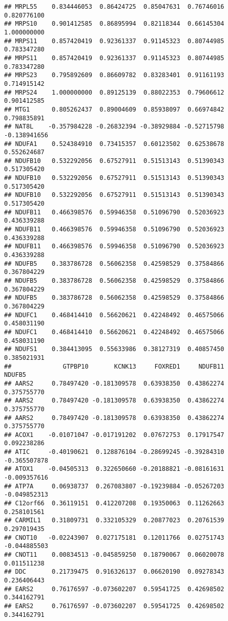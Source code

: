 \documentclass[
]{article}
\begin{document}
\begin{verbatim}
## MRPL55    0.834446053  0.86424725  0.85047631  0.76746016  0.820776100
## MRPS10    0.901412585  0.86895994  0.82118344  0.66145304  1.000000000
## MRPS11    0.857420419  0.92361337  0.91145323  0.80744985  0.783347280
## MRPS11    0.857420419  0.92361337  0.91145323  0.80744985  0.783347280
## MRPS23    0.795892609  0.86609782  0.83283401  0.91161193  0.714915142
## MRPS24    1.000000000  0.89125139  0.88022353  0.79606612  0.901412585
## MTG1      0.805262437  0.89004609  0.85938097  0.66974842  0.798835891
## NAT8L    -0.357984228 -0.26832394 -0.38929884 -0.52715798 -0.138941656
## NDUFA1    0.524384910  0.73415357  0.60123502  0.62538678  0.552624687
## NDUFB10   0.532292056  0.67527911  0.51513143  0.51390343  0.517305420
## NDUFB10   0.532292056  0.67527911  0.51513143  0.51390343  0.517305420
## NDUFB10   0.532292056  0.67527911  0.51513143  0.51390343  0.517305420
## NDUFB11   0.466398576  0.59946358  0.51096790  0.52036923  0.436339288
## NDUFB11   0.466398576  0.59946358  0.51096790  0.52036923  0.436339288
## NDUFB11   0.466398576  0.59946358  0.51096790  0.52036923  0.436339288
## NDUFB5    0.383786728  0.56062358  0.42598529  0.37584866  0.367804229
## NDUFB5    0.383786728  0.56062358  0.42598529  0.37584866  0.367804229
## NDUFB5    0.383786728  0.56062358  0.42598529  0.37584866  0.367804229
## NDUFC1    0.468414410  0.56620621  0.42248492  0.46575066  0.458031190
## NDUFC1    0.468414410  0.56620621  0.42248492  0.46575066  0.458031190
## NDUFS1    0.384413095  0.55633986  0.38127319  0.40857450  0.385021931
##              GTPBP10       KCNK13     FOXRED1     NDUFB11       NDUFB5
## AARS2     0.78497420 -0.181309578  0.63938350  0.43862274  0.375755770
## AARS2     0.78497420 -0.181309578  0.63938350  0.43862274  0.375755770
## AARS2     0.78497420 -0.181309578  0.63938350  0.43862274  0.375755770
## ACOX1    -0.01071047 -0.017191202  0.07672753  0.17917547  0.092238286
## ATIC     -0.40190621  0.128876104 -0.28699245 -0.39284310 -0.365507878
## ATOX1    -0.04505313  0.322650660 -0.20188821 -0.08161631 -0.009357616
## ATP7A     0.06938737  0.267083807 -0.19239884 -0.05267203 -0.049852313
## C12orf66  0.36119151  0.412207208  0.19350063  0.11262663  0.258101561
## CARMIL1   0.31809731  0.332105329  0.20877023  0.20761539  0.297019435
## CNOT10   -0.02243907  0.027175181  0.12011766  0.02751743 -0.044885503
## CNOT11    0.00834513 -0.045859250  0.18790067  0.06020078  0.011511238
## DDC       0.21739475  0.916326137  0.06620190  0.09278343  0.236406443
## EARS2     0.76176597 -0.073602207  0.59541725  0.42698502  0.344162791
## EARS2     0.76176597 -0.073602207  0.59541725  0.42698502  0.344162791

\end{verbatim}
\end{document}
